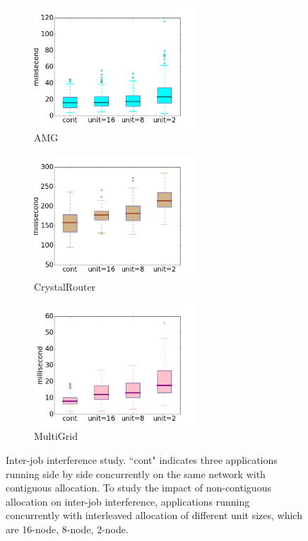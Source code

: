 \begin{figure}[t]
    \centering
    \begin{subfigure}[t]{0.32\textwidth}
        \centering
        \includegraphics[height=1.8in]{figs/inter-job/amg}
        \caption{AMG}
        \label{fig:interjob-amg}
    \end{subfigure}%
    \hspace{1em}%
    \begin{subfigure}[t]{0.32\textwidth}
        \centering
        \includegraphics[height=1.8in]{figs/inter-job/cr}
        \caption{CrystalRouter}
        \label{fig:interjob-cr}
    \end{subfigure}%
    \begin{subfigure}[t]{0.32\textwidth}
        \centering
        \includegraphics[height=1.8in]{figs/inter-job/mg}
        \caption{MultiGrid}
        \label{fig:interjob-mg}
    \end{subfigure}%
   \caption{
   Inter-job interference study. 
   ``cont" indicates three applications running side by side concurrently on the same network with contiguous allocation. 
   To study the impact of non-contiguous allocation on inter-job interference, 
   applications running concurrently with interleaved allocation of different unit sizes,
    which are 16-node, 8-node, 2-node. 
    }
   \label{fig:interjobstudy}
\end{figure}

